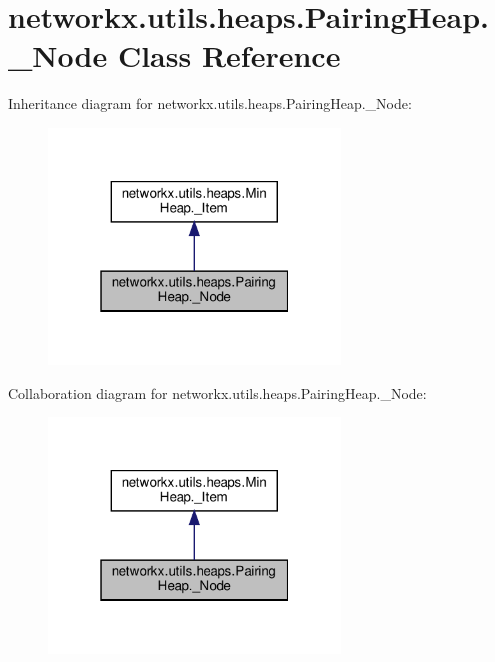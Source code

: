 \hypertarget{classnetworkx_1_1utils_1_1heaps_1_1PairingHeap_1_1__Node}{}\section{networkx.\+utils.\+heaps.\+Pairing\+Heap.\+\_\+\+Node Class Reference}
\label{classnetworkx_1_1utils_1_1heaps_1_1PairingHeap_1_1__Node}


Inheritance diagram for networkx.\+utils.\+heaps.\+Pairing\+Heap.\+\_\+\+Node\+:
\nopagebreak
\begin{figure}[H]
\begin{center}
\leavevmode
\includegraphics[width=220pt]{classnetworkx_1_1utils_1_1heaps_1_1PairingHeap_1_1__Node__inherit__graph}
\end{center}
\end{figure}


Collaboration diagram for networkx.\+utils.\+heaps.\+Pairing\+Heap.\+\_\+\+Node\+:
\nopagebreak
\begin{figure}[H]
\begin{center}
\leavevmode
\includegraphics[width=220pt]{classnetworkx_1_1utils_1_1heaps_1_1PairingHeap_1_1__Node__coll__graph}
\end{center}
\end{figure}

